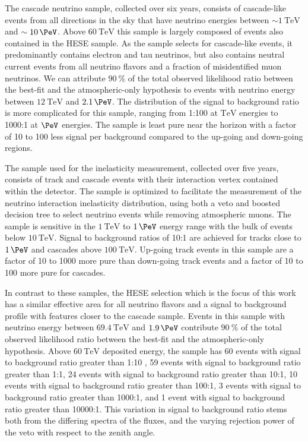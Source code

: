 The cascade neutrino sample, collected over six years, consists of cascade-like events from all directions in the sky that have neutrino energies between $\sim\SI{1}\TeV$ and $\sim\SI{10}\PeV$.
Above $\SI{60}\TeV$ this sample is largely composed of events also contained in the HESE sample.
As the sample selects for cascade-like events, it predominantly contains electron and tau neutrinos, but also contains neutral current events from all neutrino flavors and a fraction of misidentified muon neutrinos.
We can attribute $\SI{90}\percent$ of the total observed likelihood ratio between the best-fit and the atmospheric-only hypothesis to events with neutrino energy between $\SI{12}\TeV$ and $\SI{2.1}\PeV$.
The distribution of the signal to background ratio is more complicated for this sample, ranging from 1:100 at $\si\TeV$ energies to 1000:1 at $\si\PeV$ energies.
The sample is least pure near the horizon with a factor of 10 to 100 less signal per background compared to the up-going and down-going regions.

The sample used for the inelasticity measurement, collected over five years, consists of track and cascade events with their interaction vertex contained within the detector. The sample is optimized to facilitate the measurement of the neutrino interaction inelasticity distribution, using both a veto and boosted decision tree to select neutrino events while removing atmospheric muons. The sample is sensitive in the $\SI{1}\TeV$ to $\SI{1}\PeV$ energy range with the bulk of events below $\SI{10}\TeV$. Signal to background ratios of 10:1 are achieved for tracks close to $\SI{1}\PeV$ and cascades above $\SI{100}\TeV$. Up-going track events in this sample are a factor of 10 to 1000 more pure than down-going track events and a factor of 10 to 100 more pure for cascades.

In contrast to these samples, the HESE selection which is the focus of this work has a similar effective area for all neutrino flavors and a signal to background profile with features closer to the cascade sample.
Events in this sample with neutrino energy between $\SI{69.4}\TeV$ and $\SI{1.9}\PeV$ contribute $\SI{90}\percent$ of the total observed likelihood ratio between the best-fit and the atmospheric-only hypothesis.
Above $\SI{60}\TeV$ deposited energy, the sample has 60 events with signal to background ratio greater than 1:10 , 59 events with signal to background ratio greater than 1:1, 24 events with signal to background ratio greater than 10:1, 10 events with signal to background ratio greater than 100:1, 3 events with signal to background ratio greater than 1000:1, and 1 event with signal to background ratio greater than 10000:1.
This variation in signal to background ratio stems both from the differing spectra of the fluxes, and the varying rejection power of the veto with respect to the zenith angle.

